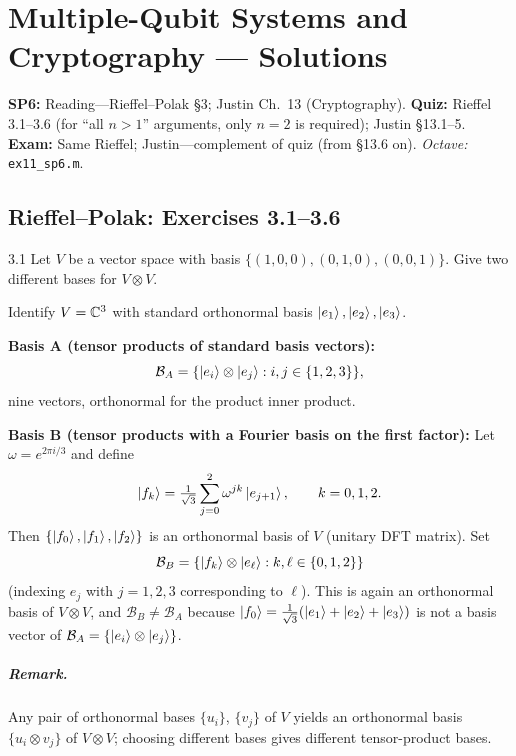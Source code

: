 \chapter{Multiple-Qubit Systems and Cryptography --- Solutions}

\noindent\textbf{SP6:} Reading---Rieffel--Polak \S3; Justin Ch.~13 (Cryptography). \textbf{Quiz:} Rieffel 3.1--3.6 (for ``all $n>1$'' arguments, only $n=2$ is required); Justin \S13.1--5. \textbf{Exam:} Same Rieffel; Justin---complement of quiz (from \S13.6 on). \textit{Octave:} \texttt{ex11\_sp6.m}.

\section*{Rieffel--Polak: Exercises 3.1--3.6}

\begin{exercise}{3.1}
Let $V$ be a vector space with basis $\{(1,0,0),(0,1,0),(0,0,1)\}$. Give two different bases for $V\otimes V$.
\end{exercise}
\begin{solution}
Identify $V=\mathbb{C}^3$ with standard orthonormal basis $\left|e_1\right\rangle,\left|e_2\right\rangle,\left|e_3\right\rangle$.

\textbf{Basis A (tensor products of standard basis vectors):}
\[
\mathcal{B}_A=\{\left|e_i\right\rangle\otimes\left|e_j\right\rangle: i,j\in\{1,2,3\}\},
\]
nine vectors, orthonormal for the product inner product.

\textbf{Basis B (tensor products with a Fourier basis on the first factor):} Let $\omega=e^{2\pi i/3}$ and define
\[
\left|f_k\right\rangle=\tfrac{1}{\sqrt{3}}\sum_{j=0}^{2}\omega^{jk}\left|e_{j+1}\right\rangle,\qquad k=0,1,2.
\]
Then $\{\left|f_0\right\rangle,\left|f_1\right\rangle,\left|f_2\right\rangle\}$ is an orthonormal basis of $V$ (unitary DFT matrix). Set
\[
\mathcal{B}_B=\{\left|f_k\right\rangle\otimes\left|e_\ell\right\rangle: k,\ell\in\{0,1,2\}\}
\]
(indexing $e_j$ with $j=1,2,3$ corresponding to $\ell$). This is again an orthonormal basis of $V\otimes V$, and $\mathcal{B}_B\neq \mathcal{B}_A$ because $\left|f_0\right\rangle=\tfrac{1}{\sqrt{3}}(\left|e_1\right\rangle+\left|e_2\right\rangle+\left|e_3\right\rangle)$ is not a basis vector of $\mathcal{B}_A=\{\left|e_i\right\rangle\otimes\left|e_j\right\rangle\}$.

\paragraph{Remark.} Any pair of orthonormal bases $\{u_i\}$, $\{v_j\}$ of $V$ yields an orthonormal basis $\{u_i\otimes v_j\}$ of $V\otimes V$; choosing different bases gives different tensor-product bases.
\end{solution}

